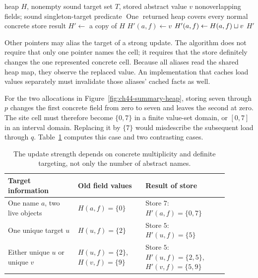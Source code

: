 \begin{algorithm}
\caption{Update an abstract heap for a valid whole-field store.}
\label{alg:ch44-store}
\begin{pseudocode}
\Require heap $H$, nonempty sound target set $T$, stored abstract value $v$
\Require nonoverlapping fields; sound singleton-target predicate $\operatorname{One}$
\Ensure returned heap covers every normal concrete store result
\State $H'\gets$ a copy of $H$
  \State $H'(a,f)\gets v$
\Else
    \State $H'(a,f)\gets H(a,f)\sqcup v$
  \EndFor
\EndIf
\State \Return $H'$
\end{pseudocode}
\end{algorithm}

Other pointers may alias the target of a strong update.
The algorithm does not require that only one pointer names the cell; it requires that the store definitely changes the one represented concrete cell.
Because all aliases read the shared heap map, they observe the replaced value.
An implementation that caches load values separately must invalidate those aliases' cached facts as well.

For the two allocations in Figure~\ref{fig:ch44-summary-heap}, storing seven through $p$ changes the first concrete field from zero to seven and leaves the second at zero.
The site cell must therefore become $\{0,7\}$ in a finite value-set domain, or $[0,7]$ in an interval domain.
Replacing it by $\{7\}$ would misdescribe the subsequent load through $q$.
Table~\ref{tab:ch44-updates} computes this case and two contrasting cases.

\begin{table}
\centering
\caption{The update strength depends on concrete multiplicity and definite targeting, not only the number of abstract names.}
\label{tab:ch44-updates}
\begin{tabular}{p{0.28\linewidth}p{0.27\linewidth}p{0.33\linewidth}}
\toprule
Target information & Old field values & Result of store \\
\midrule
One name $a$, two live objects & $H(a,f)=\{0\}$ & Store $7$: $H'(a,f)=\{0,7\}$ \\
One unique target $u$ & $H(u,f)=\{2\}$ & Store $5$: $H'(u,f)=\{5\}$ \\
Either unique $u$ or unique $v$ & $H(u,f)=\{2\}$, $H(v,f)=\{9\}$ & Store $5$: $H'(u,f)=\{2,5\}$, $H'(v,f)=\{5,9\}$ \\
\bottomrule
\end{tabular}
\end{table}

